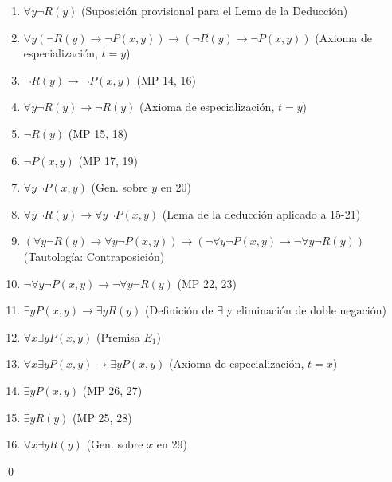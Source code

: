 \begin{enumerate}
    \item $\forall y \neg R(y)$ \hfill(Suposición provisional para el Lema de la Deducción)
    \item $\forall y (\neg R(y) \rightarrow \neg P(x, y)) \rightarrow (\neg R(y) \rightarrow \neg P(x, y))$ \hfill(Axioma de especialización, $t=y$)
    \item $\neg R(y) \rightarrow \neg P(x, y)$ \hfill(MP 14, 16)
    \item $\forall y \neg R(y) \rightarrow \neg R(y)$ \hfill(Axioma de especialización, $t=y$)
    \item $\neg R(y)$ \hfill(MP 15, 18)
    \item $\neg P(x, y)$ \hfill(MP 17, 19)
    \item $\forall y \neg P(x, y)$ \hfill(Gen. sobre $y$ en 20)
    \item $\forall y \neg R(y) \rightarrow \forall y \neg P(x, y)$ \hfill(Lema de la deducción aplicado a 15-21)

    \item $(\forall y \neg R(y) \rightarrow \forall y \neg P(x, y)) \rightarrow (\neg \forall y \neg P(x, y) \rightarrow \neg \forall y \neg R(y))$ \hfill(Tautología: Contraposición)
    \item $\neg \forall y \neg P(x, y) \rightarrow \neg \forall y \neg R(y)$ \hfill(MP 22, 23)
    \item $\exists y P(x, y) \rightarrow \exists y R(y)$ \hfill(Definición de $\exists$ y eliminación de doble negación)
    \item $\forall x \exists y P(x, y)$ \hfill(Premisa $E_1$)
    \item $\forall x \exists y P(x, y) \rightarrow \exists y P(x, y)$ \hfill(Axioma de especialización, $t = x$)
    \item $\exists y P(x, y)$ \hfill(MP 26, 27)
    \item $\exists y R(y)$ \hfill(MP 25, 28)
    \item $\forall x \exists y R(y)$ \hfill(Gen. sobre $x$ en 29)
\end{enumerate}

\hfill \qed

